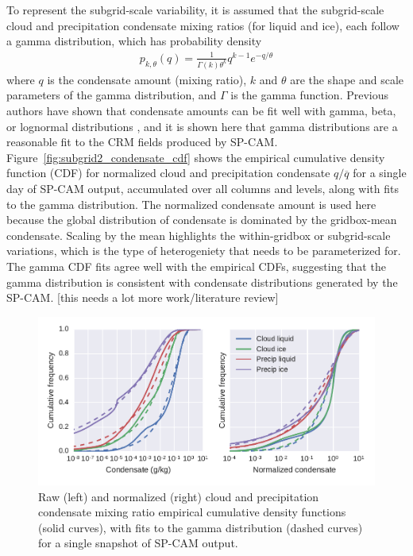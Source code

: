 To represent the subgrid-scale variability, it is assumed that the
subgrid-scale cloud and precipitation condensate mixing ratios (for
liquid and ice), each follow a gamma distribution, which has probability
density \[\begin{gathered}
p_{k, \theta}(q) = \frac{1}{\Gamma(k) \theta^k} q^{k - 1}
e^{-q/\theta}\end{gathered}\] where \(q\) is the condensate amount
(mixing ratio), \(k\) and \(\theta\) are the shape and scale parameters
of the gamma distribution, and \(\Gamma\) is the gamma function.
Previous authors have shown that condensate amounts can be fit well with
gamma, beta, or lognormal distributions \citep[e.g.;][]{lee_et_al_2010},
and it is shown here that gamma distributions are a reasonable fit to
the CRM fields produced by SP-CAM.
Figure~\ref{fig:subgrid2_condensate_cdf} shows the empirical cumulative
density function (CDF) for normalized cloud and precipitation condensate
\(q / \overline{q}\) for a single day of SP-CAM output, accumulated over
all columns and levels, along with fits to the gamma distribution. The
normalized condensate amount is used here because the global
distribution of condensate is dominated by the gridbox-mean condensate.
Scaling by the mean highlights the within-gridbox or subgrid-scale
variations, which is the type of heterogeniety that needs to be
parameterized for. The gamma CDF fits agree well with the empirical
CDFs, suggesting that the gamma distribution is consistent with
condensate distributions generated by the SP-CAM. {[}this needs a lot
more work/literature review{]}

\begin{figure}[htbp]
\centering
\includegraphics{graphics/subgrid2_mxratio_cdf1.pdf}
\caption{\label{fig:subgrid2_condensate_cdf}Raw (left) and normalized
(right) cloud and precipitation condensate mixing ratio empirical
cumulative density functions (solid curves), with fits to the gamma
distribution (dashed curves) for a single snapshot of SP-CAM
output.}\label{fig:subgrid2ux5fcondensateux5fcdf}
\end{figure}

